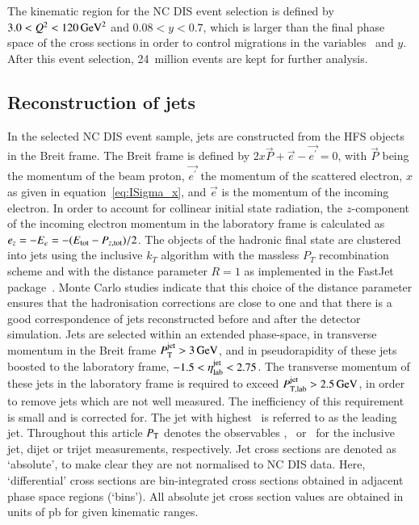 \documentclass[12pt]{article}
\begin{document}
The kinematic region for the NC DIS event selection is defined by $3.0<\Qsq<120\,\GeVsq$ and $0.08<y<0.7$, 
which is larger than the final phase space of the cross sections in order to control migrations in the
variables \Qsq\ and $y$.
After this event selection, 24~million  events are kept for further analysis. %

\subsection{Reconstruction of jets}
\label{sec:jetreco}
In the selected NC DIS event sample, jets are constructed from the HFS objects
in the Breit frame. 
The Breit frame is defined by $2x\vec{P} + \vec{e} - \vec{e^\prime} = 0$, with $\vec{P}$ being 
the momentum of the beam proton, $\vec{e^\prime}$  the momentum of the scattered electron, 
$x$ as given in equation~\ref{eq:ISigma_x}, and $\vec{e}$ is the momentum of the incoming electron.
In order to account for collinear initial state radiation, the $z$-component of the incoming electron momentum in the
laboratory frame is calculated as $e_{z}= -E_{e} = -(E_{\rm tot}-P_{z,{\rm tot}})/2$.
The objects of the hadronic final state are clustered 
into jets using the inclusive $k_T$ 
algorithm with the massless $P_T$ recombination scheme and with the distance 
parameter $R = 1$ as implemented in the FastJet package~\cite{kt_algo,fastjet}. 
Monte Carlo studies indicate that this choice of the distance parameter ensures that 
the hadronisation corrections are close to one and that there is 
a good correspondence of jets reconstructed before and after the detector simulation. 
%
Jets are selected within an extended phase-space, in transverse momentum in the Breit frame $\ptjet > 3\,\GeV$, and in pseudorapidity 
of these jets boosted to the laboratory frame, $-1.5<\etalab<2.75$. 
%
The transverse momentum of these jets in the laboratory frame is required to exceed $P_{\rm T,lab}^{\rm jet}>2.5\,\GeV$, in order to remove jets which are not well measured.
The inefficiency of this requirement is small and is corrected for.
The jet with highest \ptjet\ is referred to as the leading jet.
Throughout this article $\pt$ denotes the observables \ptjet, \meanptdi\ or \meanpttri\ for 
the inclusive jet, dijet or trijet measurements, respectively.
Jet cross sections are denoted as `absolute', to make clear they are not normalised to NC DIS data.
Here, `differential' cross sections are bin-integrated  cross sections obtained in adjacent phase space regions (`bins').
All absolute jet cross section values are obtained in units of pb for given kinematic ranges.
\end{document}
